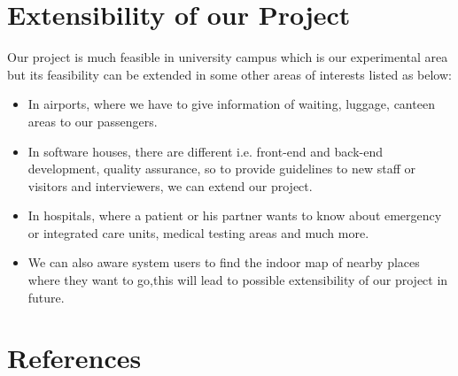 \documentclass{article}
\begin{document}
\section{Extensibility of our Project}
Our project is much feasible in university campus which is our experimental area but its feasibility can be extended in some other areas of interests listed as below:
\begin{itemize}
\item In airports, where we have to give information of waiting, luggage, canteen areas to our passengers.
\item In software houses, there are different i.e. front-end and back-end development, quality assurance, so to provide guidelines to new staff or visitors and interviewers, we can extend our project. 
\item In hospitals, where a patient or his partner wants to know about emergency or integrated care units, medical testing areas and much more.
\item We can also aware system users to find the indoor map of nearby places where they want to go,this will lead to possible extensibility of our project in future.
\end{itemize}
\pagebreak



\section{References}




\end{document}

